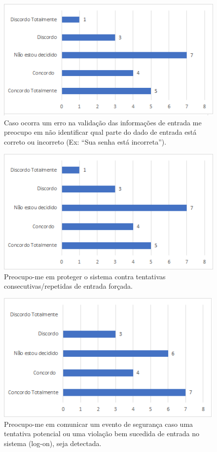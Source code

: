 \begin{figure}[!t]
\centering
\includegraphics[scale=0.7]{figuras das questoes/2.7.png}
\caption{Caso ocorra um erro na validação das informações de entrada me preocupo em não identificar qual parte do dado de entrada está correto ou incorreto (Ex: “Sua senha está incorreta”).}
\end{figure}

\begin{figure}[!t]
\centering
\includegraphics[scale=0.7]{figuras das questoes/2.8.png}
\caption{Preocupo-me em proteger o sistema contra tentativas consecutivas/repetidas de entrada forçada.}
\end{figure}

\begin{figure}[!t]
\centering
\includegraphics[scale=0.7]{figuras das questoes/2.9.png}
\caption{Preocupo-me em comunicar um evento de segurança caso uma tentativa potencial ou uma violação bem sucedida de entrada no sistema (log-on), seja detectada.}
\end{figure}

